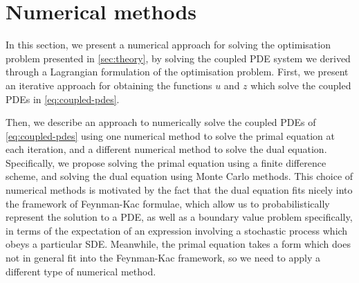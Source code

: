 \section{Numerical methods}

In this section, we present a numerical approach for solving the optimisation problem presented in \autoref{sec:theory}, by solving the coupled PDE system we derived through a Lagrangian formulation of the optimisation problem. First, we present an iterative approach for obtaining the functions $u$ and $z$ which solve the coupled PDEs in \autoref{eq:coupled-pdes}. 

Then, we describe an approach to numerically solve the coupled PDEs of \autoref{eq:coupled-pdes} using one numerical method to solve the primal equation at each iteration, and a different numerical method to solve the dual equation. Specifically, we propose solving the primal equation using a finite difference scheme, and solving the dual equation using Monte Carlo methods. This choice of numerical methods is motivated by the fact that the dual equation fits nicely into the framework of Feynman-Kac formulae, which allow us to probabilistically represent the solution to a PDE, as well as a boundary value problem specifically, in terms of the expectation of an expression involving a stochastic process which obeys a particular SDE. Meanwhile, the primal equation takes a form which does not in general fit into the Feynman-Kac framework, so we need to apply a different type of numerical method. 

